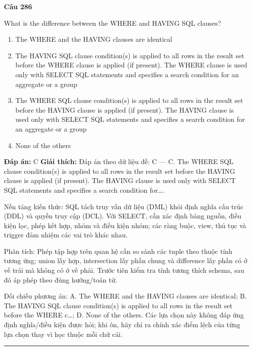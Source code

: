 \documentclass[11pt,a4paper]{article}
\newenvironment{question}[1]{%
  \par\vspace{1em}\noindent\textbf{\large Câu #1}\par\vspace{0.4em}
}{%
  \par\vspace{1em}\hrule\vspace{0.6em}
}
\newenvironment{choices}{%
  \begin{enumerate}[label=\textbf{\Alph*.},leftmargin=2.2em,itemsep=2pt,topsep=3pt]
}{%
  \end{enumerate}
}
\newcommand{\choice}{\item}
\begin{document}
\begin{question}{286}
What is the difference between the WHERE and HAVING SQL clauses?
\begin{choices}
\choice The WHERE and the HAVING clauses are identical
\choice The HAVING SQL clause condition(s) is applied to all rows in the result set before the WHERE clause is applied (if present). The WHERE clause is used only with SELECT SQL statements and specifies a search condition for an aggregate or a group
\choice The WHERE SQL clause condition(s) is applied to all rows in the result set before the HAVING clause is applied (if present). The HAVING clause is used only with SELECT SQL statements and specifies a search condition for an aggregate or a group
\choice None of the others
\end{choices}
\textbf{Đáp án:} C
\textbf{Giải thích:} Đáp án theo dữ liệu đề: C — C. The WHERE SQL clause condition(s) is applied to all rows in the result set before the HAVING clause is applied (if present). The HAVING clause is used only with SELECT SQL statements and specifies a search condition for….

Nền tảng kiến thức: SQL tách truy vấn dữ liệu (DML) khỏi định nghĩa cấu trúc (DDL) và quyền truy cập (DCL). Với SELECT, cần xác định bảng nguồn, điều kiện lọc, phép kết hợp, nhóm và điều kiện nhóm; các ràng buộc, view, thủ tục và trigger đảm nhiệm các vai trò khác nhau.

Phân tích: Phép tập hợp trên quan hệ cần so sánh các tuple theo thuộc tính tương ứng; union lấy hợp, intersection lấy phần chung và difference lấy phần có ở vế trái mà không có ở vế phải. Trước tiên kiểm tra tính tương thích schema, sau đó áp phép theo đúng hướng/toán tử.

Đối chiếu phương án: A. The WHERE and the HAVING clauses are identical; B. The HAVING SQL clause condition(s) is applied to all rows in the result set before the WHERE c…; D. None of the others. Các lựa chọn này không đáp ứng định nghĩa/điều kiện được hỏi; khi ôn, hãy chỉ ra chính xác điểm lệch của từng lựa chọn thay vì học thuộc mỗi chữ cái.
\end{question}
\end{document}
